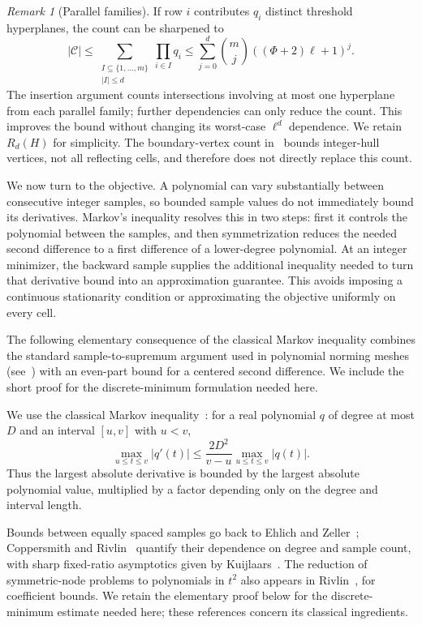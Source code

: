 \documentclass[11pt]{article}
\theoremstyle{definition}\newtheorem{definition}{Definition}[section]
\theoremstyle{remark}\newtheorem{remark}[theorem]{Remark}
\begin{document}
\begin{remark}[Parallel families]
If row $i$ contributes $q_i$ distinct threshold hyperplanes, the count can be sharpened to
\[
 |\mathcal C|\le
 \sum_{\substack{I\subseteq\{1,\ldots,m\}\\|I|\le d}}
 \prod_{i\in I}q_i
 \le\sum_{j=0}^d\binom mj((\Phi+2)\ell+1)^j.
\]
The insertion argument counts intersections involving at most one hyperplane from each parallel family; further dependencies can only reduce the count. This improves the bound without changing its worst-case $\ell^d$ dependence. We retain $R_d(H)$ for simplicity. The boundary-vertex count in~\cite[pp.~30--31]{CHKM} bounds integer-hull vertices, not all reflecting cells, and therefore does not directly replace this count.
\end{remark}

We now turn to the objective. A polynomial can vary substantially between consecutive integer samples, so bounded sample values do not immediately bound its derivatives. Markov's inequality resolves this in two steps: first it controls the polynomial between the samples, and then symmetrization reduces the needed second difference to a first difference of a lower-degree polynomial. At an integer minimizer, the backward sample supplies the additional inequality needed to turn that derivative bound into an approximation guarantee. This avoids imposing a continuous stationarity condition or approximating the objective uniformly on every cell.

The following elementary consequence of the classical Markov inequality combines the standard sample-to-supremum argument used in polynomial norming meshes (see~\cite[proof of Proposition~2]{PV}) with an even-part bound for a centered second difference. We include the short proof for the discrete-minimum formulation needed here.

We use the classical Markov inequality~\cite[Theorem~5.1.8]{BorweinErdelyi}: for a real polynomial $q$ of degree at most $D$ and an interval $[u,v]$ with $u<v$,
\[
 \max_{u\le t\le v}|q'(t)|
 \le\frac{2D^2}{v-u}\max_{u\le t\le v}|q(t)|.
\]
Thus the largest absolute derivative is bounded by the largest absolute polynomial value, multiplied by a factor depending only on the degree and interval length.

Bounds between equally spaced samples go back to Ehlich and Zeller~\cite{EhlichZeller}; Coppersmith and Rivlin~\cite{CoppersmithRivlin} quantify their dependence on degree and sample count, with sharp fixed-ratio asymptotics given by Kuijlaars~\cite{Kuijlaars}. The reduction of symmetric-node problems to polynomials in $t^2$ also appears in Rivlin~\cite[p.~539]{RivlinSurvey}, for coefficient bounds. We retain the elementary proof below for the discrete-minimum estimate needed here; these references concern its classical ingredients.
\end{document}
